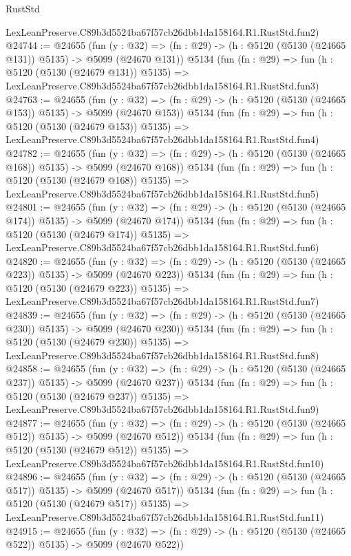 \begin{lexlean}{RustStd}
\begin{coremodule}
    LexLeanPreserve.C89b3d5524ba67f57cb26dbb1da158164.R1.RustStd.fun2)
@24744 := @24655
    (fun (y : @32) => (fn : @29) -> (h : @5120 (@5130 (@24665 @131)) @5135) -> @5099 (@24670 @131))
    @5134
    (fun (fn : @29) =>
    fun (h : @5120 (@5130 (@24679 @131)) @5135) =>
    LexLeanPreserve.C89b3d5524ba67f57cb26dbb1da158164.R1.RustStd.fun3)
@24763 := @24655
    (fun (y : @32) => (fn : @29) -> (h : @5120 (@5130 (@24665 @153)) @5135) -> @5099 (@24670 @153))
    @5134
    (fun (fn : @29) =>
    fun (h : @5120 (@5130 (@24679 @153)) @5135) =>
    LexLeanPreserve.C89b3d5524ba67f57cb26dbb1da158164.R1.RustStd.fun4)
@24782 := @24655
    (fun (y : @32) => (fn : @29) -> (h : @5120 (@5130 (@24665 @168)) @5135) -> @5099 (@24670 @168))
    @5134
    (fun (fn : @29) =>
    fun (h : @5120 (@5130 (@24679 @168)) @5135) =>
    LexLeanPreserve.C89b3d5524ba67f57cb26dbb1da158164.R1.RustStd.fun5)
@24801 := @24655
    (fun (y : @32) => (fn : @29) -> (h : @5120 (@5130 (@24665 @174)) @5135) -> @5099 (@24670 @174))
    @5134
    (fun (fn : @29) =>
    fun (h : @5120 (@5130 (@24679 @174)) @5135) =>
    LexLeanPreserve.C89b3d5524ba67f57cb26dbb1da158164.R1.RustStd.fun6)
@24820 := @24655
    (fun (y : @32) => (fn : @29) -> (h : @5120 (@5130 (@24665 @223)) @5135) -> @5099 (@24670 @223))
    @5134
    (fun (fn : @29) =>
    fun (h : @5120 (@5130 (@24679 @223)) @5135) =>
    LexLeanPreserve.C89b3d5524ba67f57cb26dbb1da158164.R1.RustStd.fun7)
@24839 := @24655
    (fun (y : @32) => (fn : @29) -> (h : @5120 (@5130 (@24665 @230)) @5135) -> @5099 (@24670 @230))
    @5134
    (fun (fn : @29) =>
    fun (h : @5120 (@5130 (@24679 @230)) @5135) =>
    LexLeanPreserve.C89b3d5524ba67f57cb26dbb1da158164.R1.RustStd.fun8)
@24858 := @24655
    (fun (y : @32) => (fn : @29) -> (h : @5120 (@5130 (@24665 @237)) @5135) -> @5099 (@24670 @237))
    @5134
    (fun (fn : @29) =>
    fun (h : @5120 (@5130 (@24679 @237)) @5135) =>
    LexLeanPreserve.C89b3d5524ba67f57cb26dbb1da158164.R1.RustStd.fun9)
@24877 := @24655
    (fun (y : @32) => (fn : @29) -> (h : @5120 (@5130 (@24665 @512)) @5135) -> @5099 (@24670 @512))
    @5134
    (fun (fn : @29) =>
    fun (h : @5120 (@5130 (@24679 @512)) @5135) =>
    LexLeanPreserve.C89b3d5524ba67f57cb26dbb1da158164.R1.RustStd.fun10)
@24896 := @24655
    (fun (y : @32) => (fn : @29) -> (h : @5120 (@5130 (@24665 @517)) @5135) -> @5099 (@24670 @517))
    @5134
    (fun (fn : @29) =>
    fun (h : @5120 (@5130 (@24679 @517)) @5135) =>
    LexLeanPreserve.C89b3d5524ba67f57cb26dbb1da158164.R1.RustStd.fun11)
@24915 := @24655
    (fun (y : @32) => (fn : @29) -> (h : @5120 (@5130 (@24665 @522)) @5135) -> @5099 (@24670 @522))

\end{coremodule}
\end{lexlean}
